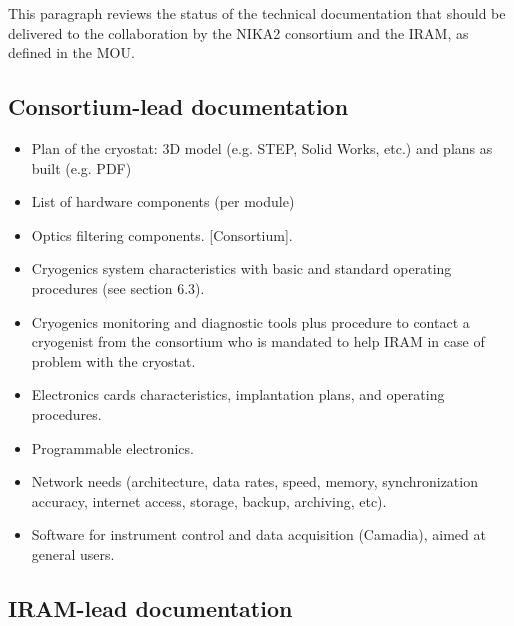 %

This paragraph reviews the status of the technical documentation that should be delivered to the collaboration by the NIKA2 consortium and the IRAM, as defined in the MOU.


\subsection{Consortium-lead documentation}

\begin{itemize}

\item Plan of the cryostat: 3D model (e.g. STEP, Solid Works, etc.) and plans as built (e.g. PDF)
  
\item List of hardware components (per module)

\item Optics filtering components. [Consortium].

\item Cryogenics system characteristics with basic and standard operating procedures (see section 6.3). 

\item Cryogenics monitoring and diagnostic tools plus procedure to contact a cryogenist from the consortium who is mandated to help IRAM in case of problem with the cryostat. 
  
\item  Electronics cards characteristics, implantation plans, and operating procedures. 

\item Programmable electronics.
  
\item Network needs (architecture, data rates, speed, memory, synchronization accuracy, internet access, storage, backup, archiving, etc). 

\item Software for instrument control and data acquisition (Camadia), aimed at general users. 

\end{itemize}


\subsection{IRAM-lead documentation}

